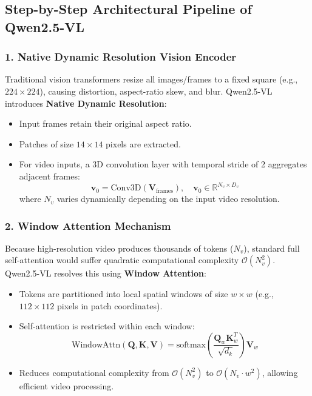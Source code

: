 \documentclass[a4paper, 11pt]{article}
\begin{document}
\subsection{Step-by-Step Architectural Pipeline of Qwen2.5-VL}

\subsubsection{1. Native Dynamic Resolution Vision Encoder}
Traditional vision transformers resize all images/frames to a fixed square (e.g., $224 \times 224$), causing distortion, aspect-ratio skew, and blur. Qwen2.5-VL introduces \textbf{Native Dynamic Resolution}:
\begin{itemize}
    \item Input frames retain their original aspect ratio.
    \item Patches of size $14 \times 14$ pixels are extracted.
    \item For video inputs, a 3D convolution layer with temporal stride of 2 aggregates adjacent frames:
    \begin{equation}
        \mathbf{v}_0 = \text{Conv3D}(\mathbf{V}_{\text{frames}}), \quad \mathbf{v}_0 \in \mathbb{R}^{N_v \times D_v}
    \end{equation}
    where $N_v$ varies dynamically depending on the input video resolution.
\end{itemize}

\subsubsection{2. Window Attention Mechanism}
Because high-resolution video produces thousands of tokens ($N_v$), standard full self-attention would suffer quadratic computational complexity $\mathcal{O}(N_v^2)$. Qwen2.5-VL resolves this using \textbf{Window Attention}:
\begin{itemize}
    \item Tokens are partitioned into local spatial windows of size $w \times w$ (e.g., $112 \times 112$ pixels in patch coordinates).
    \item Self-attention is restricted within each window:
    \begin{equation}
        \text{WindowAttn}(\mathbf{Q}, \mathbf{K}, \mathbf{V}) = \text{softmax}\left(\frac{\mathbf{Q}_w \mathbf{K}_w^T}{\sqrt{d_k}}\right)\mathbf{V}_w
    \end{equation}
    \item Reduces computational complexity from $\mathcal{O}(N_v^2)$ to $\mathcal{O}(N_v \cdot w^2)$, allowing efficient video processing.
\end{itemize}
\end{document}

